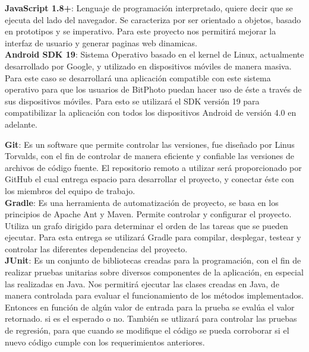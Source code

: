 \documentclass{memoria}
\begin{document}
\textbf{JavaScript 1.8+}: Lenguaje de programación interpretado, quiere decir que se ejecuta del lado del navegador. Se caracteriza por ser orientado a objetos, basado en prototipos y se imperativo. Para este proyecto nos permitirá mejorar la interfaz de usuario y generar paginas web dinamicas.\\

\textbf{Android SDK 19}: Sistema Operativo basado en el kernel de Linux, actualmente desarrollado por Google, y utilizado en dispositivos móviles de manera masiva. Para este caso se desarrollará una aplicación compatible con este sistema operativo para que los usuarios de BitPhoto puedan hacer uso de éste a través de sus dispositivos móviles. Para esto se utilizará el SDK versión 19 para compatibilizar la aplicación con todos los dispositivos Android de versión 4.0 en adelante.\\


\textbf{Git}: Es un software que permite controlar las versiones, fue diseñado por Linus Torvalds, con el fin de controlar de manera eficiente y confiable las versiones de archivos de código fuente. El repositorio remoto a utilizar será proporcionado por GitHub el cual entrega espacio para desarrollar el proyecto, y conectar éste con los miembros del equipo de trabajo.\\


\textbf{Gradle}: Es una herramienta de automatización de proyecto, se basa en los principios de Apache Ant y Maven. Permite controlar y configurar el proyecto. Utiliza un grafo dirigido para determinar el orden de las tareas que se pueden ejecutar. Para esta entrega se utilizará Gradle para compilar, desplegar, testear y controlar las diferentes dependencias del proyecto.\\

\textbf{JUnit}: Es un conjunto de bibliotecas creadas para la programación, con el fin de realizar pruebas unitarias sobre diversos componentes de la aplicación, en especial las realizadas en Java. Nos permitirá ejecutar las clases creadas en Java, de manera controlada para evaluar el funcionamiento de los métodos implementados. Entonces en función de algún valor de entrada para la prueba se evalúa el valor retornado. si es el esperado o no. También se utlizará para controlar las pruebas de regresión, para que cuando se modifique el código se pueda corroborar si el nuevo código cumple con los requerimientos anteriores.\\
\end{document}
